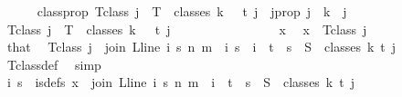 \begin{isabellebody}
\ \ \ \ \isamarkupfalse%
\ classprop{\isacharcolon}{\kern0pt}\ {\isachardoublequoteopen}T{\isacharunderscore}{\kern0pt}class\ j\ {\isacharequal}{\kern0pt}\ T\ {\isacharbackquote}{\kern0pt}\ classes\ {\isacharparenleft}{\kern0pt}k\ {\isacharplus}{\kern0pt}\ {}{\isacharparenright}{\kern0pt}\ t\ j{\isachardoublequoteclose}\ \ j{\isacharunderscore}{\kern0pt}prop{\isacharcolon}{\kern0pt}\ {\isachardoublequoteopen}j\ {\isasymle}\ k{\isachardoublequoteclose}\ \ j\isanewline
\ \ \ \ \isamarkupfalse%
\isanewline
\ \ \ \ \ \ \isamarkupfalse%
\ {\isachardoublequoteopen}T{\isacharunderscore}{\kern0pt}class\ j\ {\isasymsubseteq}\ T\ {\isacharbackquote}{\kern0pt}\ classes\ {\isacharparenleft}{\kern0pt}k\ {\isacharplus}{\kern0pt}\ {}{\isacharparenright}{\kern0pt}\ t\ j{\isachardoublequoteclose}\isanewline
\ \ \ \ \ \ \isamarkupfalse%
\isanewline
\ \ \ \ \ \ \ \ \isamarkupfalse%
\ x\ \isamarkupfalse%
\ {\isachardoublequoteopen}x\ {\isasymin}\ T{\isacharunderscore}{\kern0pt}class\ j{\isachardoublequoteclose}\isanewline
\ \ \ \ \ \ \ \ \isamarkupfalse%
\ that\ \isamarkupfalse%
\ {\isachardoublequoteopen}T{\isacharunderscore}{\kern0pt}class\ j\ {\isacharequal}{\kern0pt}\ {\isacharbraceleft}{\kern0pt}join\ {\isacharparenleft}{\kern0pt}L{\isacharunderscore}{\kern0pt}line\ i{\isacharparenright}{\kern0pt}\ s\ n\ m\ {\isacharbar}{\kern0pt}\ i\ s\ {\isachardot}{\kern0pt}\ i\ {\isasymin}\ {\isacharbraceleft}{\kern0pt}{\isachardot}{\kern0pt}{\isachardot}{\kern0pt}{\isacharless}{\kern0pt}t{\isacharbraceright}{\kern0pt}\ {\isasymand}\ s\ {\isasymin}\ S\ {\isacharbackquote}{\kern0pt}\ {\isacharparenleft}{\kern0pt}classes\ k\ t\ j{\isacharparenright}{\kern0pt}{\isacharbraceright}{\kern0pt}{\isachardoublequoteclose}\ \isamarkupfalse%
\ T{\isacharunderscore}{\kern0pt}class{\isacharunderscore}{\kern0pt}def\ \isamarkupfalse%
\ simp\isanewline
\ \ \ \ \ \ \ \ \isamarkupfalse%
\ \isamarkupfalse%
\ i\ s\ \ is{\isacharunderscore}{\kern0pt}defs{\isacharcolon}{\kern0pt}\ {\isachardoublequoteopen}x\ {\isacharequal}{\kern0pt}\ join\ {\isacharparenleft}{\kern0pt}L{\isacharunderscore}{\kern0pt}line\ i{\isacharparenright}{\kern0pt}\ s\ n\ m\ {\isasymand}\ i\ {\isacharless}{\kern0pt}\ t\ {\isasymand}\ s\ {\isasymin}\ S\ {\isacharbackquote}{\kern0pt}\ {\isacharparenleft}{\kern0pt}classes\ k\ t\ j{\isacharparenright}{\kern0pt}{\isachardoublequoteclose}\ \isamarkupfalse%

\end{isabellebody}
